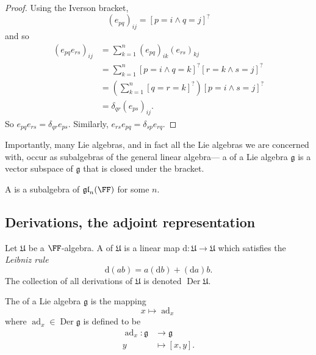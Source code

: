 \documentclass{article}
\newcommand{\lb}[1]{\ensuremath{\left[{#1}\right]}}
\newcommand{\iverson}[1]{\ensuremath{\left[{#1}\right]^?}}
\DeclareMathOperator{\Der}{Der}
\DeclareMathOperator{\ad}{ad}
\newcommand{\dd}{\ensuremath{\text{d}}}
\newcommand{\frkg}{\ensuremath{\mathfrak{g}}}
\newcommand{\frkU}{\ensuremath{\mathfrak{U}}}
\newcommand{\glalg}{\ensuremath{\mathfrak{gl}}}
\begin{document}
\begin{proof}
    Using the Iverson bracket,
    \[
        (e_{pq})_{ij}
        =
        \iverson{p=i \wedge q=j}
    \]
    and so
    \begin{align*}
        (e_{pq}e_{rs})_{ij}
        &=
        \sum_{k=1}^n
        (e_{pq})_{ik}
        (e_{rs})_{kj}
        \\
        &=
        \sum_{k=1}^n
        \iverson{p=i \wedge q=k}
        \iverson{r=k \wedge s=j}
        \\
        &=
        \left(
            \sum_{k=1}^n
            \iverson{q=r=k}
        \right)
        \iverson{p=i \wedge s=j}
        \\
        &=
        \delta_{qr}
        (e_{ps})_{ij}.
    \end{align*}
    So $e_{pq}e_{rs} = \delta_{qr}e_{ps}$. 
    Similarly,
    $e_{rs}e_{pq} = \delta_{sp}e_{rq}$.
\end{proof}

Importantly, many Lie algebras, and in fact all the Lie algebras we are concerned with, occur as subalgebras of the general linear algebra--- a  of a Lie algebra $\frkg$ is a vector subspace of $\frkg$ that is closed under the bracket.

\begin{definition}
    A  is a subalgebra of $\glalg_n(\FF)$ for some $n$.
\end{definition}


\subsection{Derivations, the adjoint representation}

\begin{definition}
    Let $\frkU$ be a $\FF$-algebra.
    A  of $\frkU$ is a linear map $\dd: \frkU \to \frkU$ which satisfies the \textit{Leibniz rule}
    \[
        \dd(ab)
        =
        a(\dd b) + (\dd a) b.
    \]
    The collection of all derivations of $\frkU$ is denoted $\Der \frkU$.
\end{definition}

\begin{definition}
    The  of a Lie algebra $\frkg$ is the mapping
    \[
        x \mapsto \ad_x
    \]
    where $\ad_x \in \Der \frkg$ is defined to be
    \begin{align*}
        \ad_x: 
        \frkg 
        &\to 
        \frkg \\
        y 
        &\mapsto
        \lb{x,y}.
    \end{align*}
\end{definition}
\end{document}
